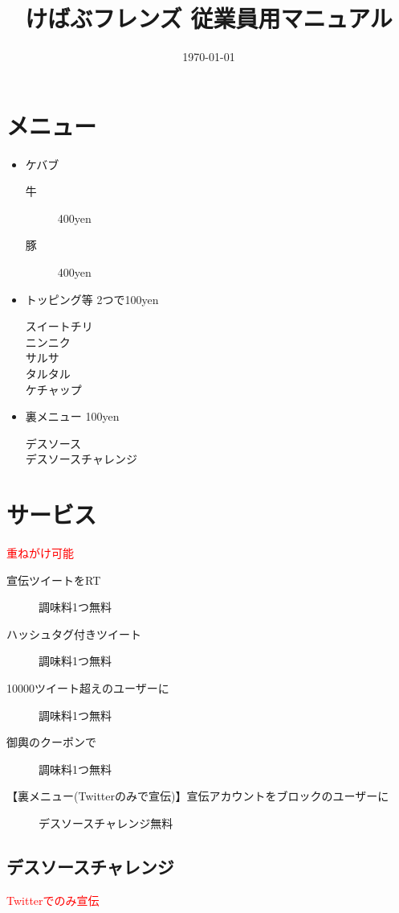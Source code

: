 \documentclass[10pt,a4paper]{jarticle}
\title{けばぶフレンズ 従業員用マニュアル}
\date{\today}
\begin{document}
  \maketitle
  \tableofcontents

  \section{メニュー}
\begin{itemize}
  \item ケバブ
  \begin{description}
    \item[牛] 400yen
    \item[豚] 400yen
  \end{description}
  \item トッピング等 2つで100yen
  \begin{description}
    \item[スイートチリ]
    \item[ニンニク]
    \item[サルサ]
    \item[タルタル]
    \item[ケチャップ]
  \end{description}
  \item 裏メニュー 100yen
  \begin{description}
    \item[デスソース]
    \item[デスソースチャレンジ]
  \end{description}
\end{itemize}

\section{サービス}
\textcolor{red}{重ねがけ可能}
\begin{description}
  \item[宣伝ツイートをRT] 調味料1つ無料
  \item[ハッシュタグ付きツイート] 調味料1つ無料
  \item[10000ツイート超えのユーザーに] 調味料1つ無料
  \item[御輿のクーポンで] 調味料1つ無料
  \item[【裏メニュー(Twitterのみで宣伝)】宣伝アカウントをブロックのユーザーに] デスソースチャレンジ無料
\end{description}
\subsection{デスソースチャレンジ}
\textcolor{red}{Twitterでのみ宣伝}
\end{document}
